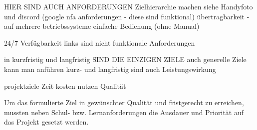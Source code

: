 HIER SIND AUCH ANFORDERUNGEN
Zielhierarchie machen siehe Handyfoto und discord (google nfa anforderungen - diese sind funktional)
übertragbarkeit - auf mehrere betriebssysteme
einfache Bedienung
(ohne Manual)

24/7 Verfügbarkeit
links sind nicht funktionale Anforderungen

in kurzfristig und langfristig SIND DIE EINZIGEN ZIELE auch generelle Ziele kann man anführen
kurz- und langfristig sind auch Leistungswirkung

projektziele 
Zeit
kosten
nutzen
Qualität

Um das formulierte Ziel in gewünschter Qualität und fristgerecht zu erreichen, mussten
neben Schul- bzw. Lernanforderungen die Ausdauer und Priorität auf das Projekt
gesetzt werden.

